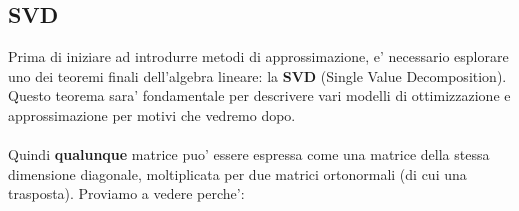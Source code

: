 \documentclass{report}
\begin{document}
\subsection{SVD}
Prima di iniziare ad introdurre metodi di approssimazione, e' necessario esplorare uno dei teoremi finali dell'algebra lineare: la \textbf{SVD} (Single Value Decomposition). Questo teorema sara' fondamentale per descrivere vari modelli di ottimizzazione e approssimazione per motivi che vedremo dopo.\\
\\
Quindi \textbf{qualunque} matrice puo' essere espressa come una matrice della stessa dimensione diagonale, moltiplicata per due matrici ortonormali (di cui una trasposta). Proviamo a vedere perche':
\pf{}{

}
\end{document}
